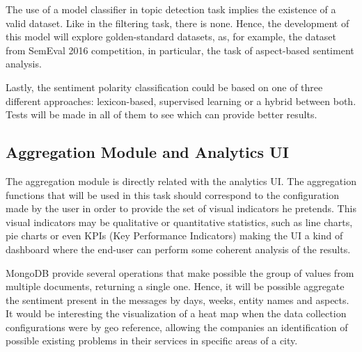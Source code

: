The use of a model classifier in topic detection task implies the existence of a valid dataset. Like in the filtering task, there is none. Hence, the development of this model will explore golden-standard datasets, as, for example, the dataset from SemEval 2016 competition, in particular, the task of aspect-based sentiment analysis.

Lastly, the sentiment polarity classification could be based on one of three different approaches: lexicon-based, supervised learning or a hybrid between both. Tests will be made in all of them to see which can provide better results.

\subsection{Aggregation Module and Analytics UI}
The aggregation module is directly related with the analytics UI. The aggregation functions that will be used in this task should correspond to the configuration made by the user in order to provide the set of visual indicators he pretends. This visual indicators may be qualitative or quantitative statistics, such as line charts, pie charts or even KPIs (Key Performance Indicators) making the UI a kind of dashboard where the end-user can perform some coherent analysis of the results.

MongoDB provide several operations that make possible the group of values from multiple documents, returning a single one. Hence, it will be possible aggregate the sentiment present in the messages by days, weeks, entity names and aspects. It would be interesting the visualization of a heat map when the data collection configurations were by geo reference, allowing the companies an identification of possible existing problems in their services in specific areas of a city.